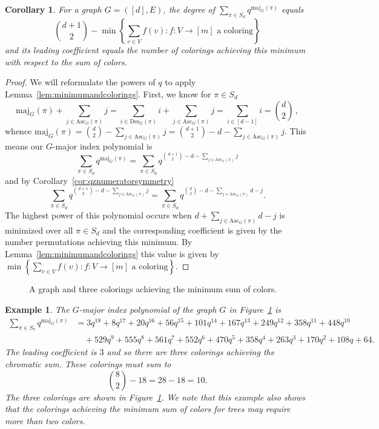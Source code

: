 \documentclass[11pt]{amsart}
\newtheorem{corollary}[theorem]{Corollary}
\newtheorem{exam}{Example}
\newenvironment{example}{\begin{exam}\sf}{\end{exam}}
\newcommand{\maj}{\mathrm{maj}}
\newcommand{\des}{\mathrm{Des}}
\newcommand{\asc}{\mathrm{Asc}}
\begin{document}
\begin{corollary}\label{cor:gmajordegree}
    For a graph $G=([d],E)$, the degree of $\sum_{\pi \in S_d} q^{\maj_G(\pi)}$ equals
    \[
        \binom{d+1}{2} - \min\left\{ \sum_{v \in V} f(v): f:V \to [m] \text{ a coloring} \right\}
    \]
    and its leading coefficient equals the number of colorings achieving this minimum with respect to the sum of colors.
\end{corollary}
\begin{proof}
    We will reformulate the powers of $q$ to apply Lemma~\ref{lem:minimumandcolorings}.
    First, we know for $\pi \in S_d$
    \[
        \maj_G(\pi) + \sum_{j \in \asc_G(\pi)} j =  \sum_{i \in \des_G(\pi)} i + \sum_{j \in \asc_G(\pi)} j =
\sum_{i \in [d-1]} i = \binom{d}{2} \, ,
    \]
    whence $\maj_G(\pi) = \binom{d}{2} - \sum_{j \in \asc_G(\pi)} j = \binom{d+1}{2} - d - \sum_{j \in \asc_G(\pi)} j $.
    This means our $G$-major index polynomial is  
    \[
        \sum_{\pi \in S_d} q^{\maj_G(\pi)} = \sum_{\pi \in S_d} q^{\binom{d+1}{2} - d - \sum_{j \in \asc_G(\pi)} j}
    \]
    and by Corollary~\ref{cor:qznumeratorsymmetry}
    \[
        \sum_{\pi \in S_d} q^{\binom{d+1}{2} - d-\sum_{j \in \asc_G(\pi)} j} = \sum_{\pi \in S_d} q^{\binom{d}{2} - d -\sum_{j \in \asc_G(\pi)} d-j}.
    \]
    The highest power of this polynomial occurs when $ d +\sum_{j \in \asc_G(\pi)} d-j$ is minimized over all
$\pi \in S_d$ and the corresponding coefficient is given by the number permutations achieving this minimum. By Lemma~\ref{lem:minimumandcolorings} this value is given by $\min\left\{ \sum_{v \in V} f(v): f:V \to [m] \text{ a coloring} \right\}$. 
\end{proof}

\begin{figure}
    
    \caption{A graph and three colorings achieving the minimum sum of colors.}\label{fig:gmajorchromaticsum}
\end{figure}

\begin{example}
    The $G$-major index polynomial of the graph $G$ in Figure~\ref{fig:gmajorchromaticsum} is 
    \begin{align*}
        \sum_{\pi \in S_7} q^{\maj_G(\pi)} &= 3q^{18} + 8q^{17} + 20q^{16} + 56q^{15} + 101q^{14} + 167q^{13} + 249q^{12} + 358q^{11} + 448q^{10} \\
        &\quad + 529q^{9} + 555q^8 + 561q^7 + 552q^6 + 470q^5 + 358q^4 + 263q^3 + 170q^2 + 108q + 64.
    \end{align*}
    The leading coefficient is $3$ and so there are three colorings achieving the chromatic sum.
    These colorings must sum to
    \[
        \binom{8}{2} - 18 = 28-18 = 10.
    \]
    The three colorings are shown in Figure~\ref{fig:gmajorchromaticsum}.
    We note that this example also shows that the colorings achieving the minimum sum of colors for trees may require more than two colors.
\end{example}
\end{document}
